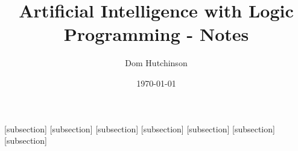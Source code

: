 \documentclass[11pt,a4paper]{article}
\begin{document}
\pagestyle{fancy}
\setlength\parindent{0pt}
\allowdisplaybreaks

\renewcommand{\headrulewidth}{0pt}

\title{Artificial Intelligence with Logic Programming - Notes}
\author{Dom Hutchinson}
\date{\today}
\maketitle

\fancyhead[R]{\today}

[subsection]
[subsection]
[subsection]
[subsection]
[subsection]
[subsection]
[subsection]

\newcommand{\dotprod}[0]{\boldsymbol{\cdot}}
\newcommand{\cosech}[0]{\mathrm{cosech}\ }
\newcommand{\cosec}[0]{\mathrm{cosec}\ }
\newcommand{\sech}[0]{\mathrm{sech}\ }
\newcommand{\prob}[0]{\mathbb{P}}
\newcommand{\nats}[0]{\mathbb{N}}
\newcommand{\cov}[0]{\mathrm{Cov}}
\newcommand{\var}[0]{\mathrm{Var}}
\newcommand{\expect}[0]{\mathbb{E}}
\newcommand{\reals}[0]{\mathbb{R}}
\newcommand{\integers}[0]{\mathbb{Z}}
\newcommand{\indicator}[0]{\mathds{1}}
\newcommand{\nb}[0]{\textit{N.B.} }
\newcommand{\ie}[0]{\textit{i.e.} }
\newcommand{\eg}[0]{\textit{e.g.} }
\newcommand{\X}[0]{\textbf{X}}
\newcommand{\x}[0]{\textbf{x}}
\newcommand{\iid}[0]{\overset{\text{iid}}{\sim}}
\newcommand{\proved}[0]{$\hfill\square$\\}
\end{document}
